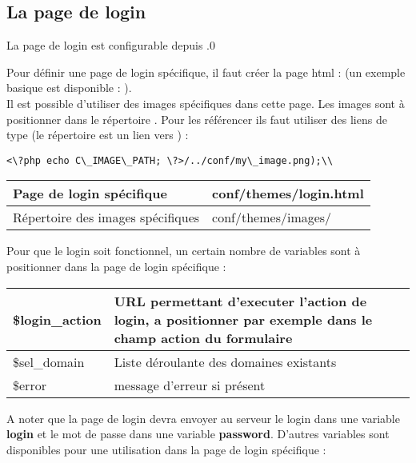 \clearpage
\subsection{La page de login}
\label{login_page}

La page de login est configurable depuis .0

Pour définir une page de login spécifique, il faut créer la page html :
 (un exemple basique est disponible : ).\\

Il est possible d'utiliser des images spécifiques dans cette page.
Les images sont à positionner dans le répertoire .
Pour les référencer ils faut utiliser des liens de type (le répertoire  est un lien vers ) :
\begin{verbatim}
<\?php echo C\_IMAGE\_PATH; \?>/../conf/my\_image.png);\\
\end{verbatim}

\begin{tabular}{|p{7cm}|p{5cm}|}
\hline
Page de login spécifique & conf/themes/login.html \\
\hline
Répertoire des images spécifiques & conf/themes/images/ \\
\hline
\end{tabular}
\vspace{0.3cm}

Pour que le login soit fonctionnel, un certain nombre de variables sont à positionner dans la page de login spécifique :\\


\begin{tabular}{|p{4cm}|p{9cm}|}
\hline
\$login\_action & URL permettant d'executer l'action de login, a positionner par exemple dans le champ action du formulaire\\
\hline
\$sel\_domain & Liste déroulante des domaines existants \\
\hline
\$error & message d'erreur si présent\\
\hline
\end{tabular}
\vspace{0.3cm}

A noter que la page de login devra envoyer au serveur le login dans une variable \textbf{login} et le mot
de passe dans une variable \textbf{password}.
D'autres variables sont disponibles pour une utilisation dans la page de login spécifique :\\

